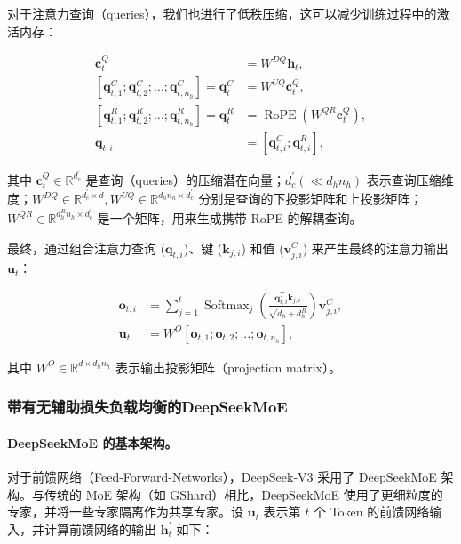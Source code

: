 \documentclass[lang=cn,a4paper,newtx]{elegantpaper}
\newcommand{\dsmoe}{DeepSeekMoE}
\newcommand{\dsviii}{DeepSeek-V3}
\begin{document}
对于注意力查询（queries），我们也进行了低秩压缩，这可以减少训练过程中的激活内存：

\begin{align}
    \mathbf{c}_{t}^{Q} &= W^{DQ} \mathbf{h}_{t}, \\
    [\mathbf{q}_{t, 1}^{C};\mathbf{q}_{t, 2}^{C};...;\mathbf{q}_{t, n_{h}}^{C}] = \mathbf{q}_{t}^{C} &= W^{UQ} \mathbf{c}_{t}^{Q}, \\
    [\mathbf{q}_{t, 1}^{R};\mathbf{q}_{t, 2}^{R};...;\mathbf{q}_{t, n_{h}}^{R}] = \mathbf{q}_{t}^{R} &= \operatorname{RoPE}({W^{QR}} \mathbf{c}_{t}^{Q}), \\
    \mathbf{q}_{t, i} &= [\mathbf{q}_{t, i}^{C}; \mathbf{q}_{t, i}^{R}],
\end{align}

其中 $\mathbf{c}_{t}^{Q} \in \mathbb{R}^{d_c^{\prime}}$ 是查询（queries）的压缩潜在向量；$d_c^{\prime} (\ll d_h n_h)$ 表示查询压缩维度；$W^{DQ} \in \mathbb{R}^{d_c^{\prime} \times d}, W^{UQ} \in \mathbb{R}^{d_h n_h \times d_c^{\prime}}$ 分别是查询的下投影矩阵和上投影矩阵；$W^{QR} \in \mathbb{R}^{d_h^R n_h \times d_c^{\prime}}$ 是一个矩阵，用来生成携带 RoPE 的解耦查询。

最终，通过组合注意力查询 ($\mathbf{q}_{t, i}$)、键 ($\mathbf{k}_{j, i}$) 和值 ($\mathbf{v}_{j, i}^{C}$) 来产生最终的注意力输出 $\mathbf{u}_{t}$：

\begin{align}
    \mathbf{o}_{t, i} &= \sum_{j=1}^{t} \operatorname{Softmax}_j(\frac{\mathbf{q}_{t, i}^T \mathbf{k}_{j, i}}{\sqrt{d_{h} + d_{h}^{R}}}) \mathbf{v}_{j, i}^{C}, \\
    \mathbf{u}_{t} &= W^{O} [\mathbf{o}_{t, 1};\mathbf{o}_{t, 2};...;\mathbf{o}_{t, n_{h}}],
\end{align}

其中 $W^{O} \in \mathbb{R}^{d \times d_h n_h}$ 表示输出投影矩阵（projection matrix）。

\subsubsection{带有无辅助损失负载均衡的\dsmoe{}}

\paragraph{\dsmoe{} 的基本架构。}
对于前馈网络（Feed-Forward-Networks），\dsviii{} 采用了 \dsmoe{} 架构。与传统的 MoE 架构（如 GShard）相比，\dsmoe{} 使用了更细粒度的专家，并将一些专家隔离作为共享专家。设 $\mathbf{u}_{t}$ 表示第 $t$ 个 Token 的前馈网络输入，并计算前馈网络的输出 $\mathbf{h}_{t}^{\prime}$ 如下：
\end{document}
